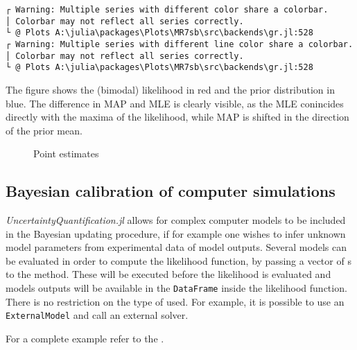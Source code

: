 \begin{verbatim}
┌ Warning: Multiple series with different color share a colorbar.
│ Colorbar may not reflect all series correctly.
└ @ Plots A:\julia\packages\Plots\MR7sb\src\backends\gr.jl:528
┌ Warning: Multiple series with different line color share a colorbar.
│ Colorbar may not reflect all series correctly.
└ @ Plots A:\julia\packages\Plots\MR7sb\src\backends\gr.jl:528
\end{verbatim}



The figure shows the (bimodal) likelihood in red and the prior distribution in blue. The difference in MAP and MLE is clearly visible, as the MLE conincides directly with the maxima of the likelihood, while MAP is shifted in the direction of the prior mean.



\begin{figure}
\centering
\caption{Point estimates}
\end{figure}




\subsection{Bayesian calibration of computer simulations}



\label{4808027176221545699}{}


\emph{UncertaintyQuantification.jl} allows for complex computer models to be included in the Bayesian updating procedure, if for example one wishes to infer unknown model parameters from experimental data of model outputs. Several models can be evaluated in order to compute the likelihood function, by passing a vector of s to the  method. These will be executed before the likelihood is evaluated and models outputs will be available in the \texttt{DataFrame} inside the likelihood function. There is no restriction on the type of  used. For example, it is possible to use an \texttt{ExternalModel} and call an external solver.



For a complete example refer to the .



